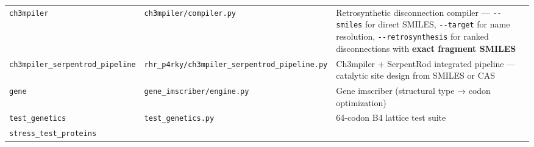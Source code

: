 \documentclass[12pt,a4paper]{article}
\begin{document}
\begin{longtable}[]{@{}lll@{}}
\begin{minipage}[t]{0.24\columnwidth}
\texttt{ch3mpiler}\strut
\end{minipage} & \begin{minipage}[t]{0.24\columnwidth}\raggedright
\texttt{ch3mpiler/compiler.py}\strut
\end{minipage} & \begin{minipage}[t]{0.43\columnwidth}\raggedright
Retrosynthetic disconnection compiler --- \texttt{-\/-smiles} for direct
SMILES, \texttt{-\/-target} for name resolution,
\texttt{-\/-retrosynthesis} for ranked disconnections with \textbf{exact
fragment SMILES}\strut
\end{minipage}\tabularnewline
\begin{minipage}[t]{0.24\columnwidth}\raggedright
\texttt{ch3mpiler\_serpentrod\_pipeline}\strut
\end{minipage} & \begin{minipage}[t]{0.24\columnwidth}\raggedright
\texttt{rhr\_p4rky/ch3mpiler\_serpentrod\_pipeline.py}\strut
\end{minipage} & \begin{minipage}[t]{0.43\columnwidth}\raggedright
Ch3mpiler + SerpentRod integrated pipeline --- catalytic site design
from SMILES or CAS\strut
\end{minipage}\tabularnewline
\begin{minipage}[t]{0.24\columnwidth}\raggedright
\texttt{gene}\strut
\end{minipage} & \begin{minipage}[t]{0.24\columnwidth}\raggedright
\texttt{gene\_imscriber/engine.py}\strut
\end{minipage} & \begin{minipage}[t]{0.43\columnwidth}\raggedright
Gene imscriber (structural type → codon optimization)\strut
\end{minipage}\tabularnewline
\begin{minipage}[t]{0.24\columnwidth}\raggedright
\texttt{test\_genetics}\strut
\end{minipage} & \begin{minipage}[t]{0.24\columnwidth}\raggedright
\texttt{test\_genetics.py}\strut
\end{minipage} & \begin{minipage}[t]{0.43\columnwidth}\raggedright
64-codon B4 lattice test suite\strut
\end{minipage}\tabularnewline
\begin{minipage}[t]{0.24\columnwidth}\raggedright
\texttt{stress\_test\_proteins}\strut
\end{minipage} & \begin{minipage}[t]{0.24\columnwidth}\raggedright

\end{minipage}
\end{longtable}
\end{document}
